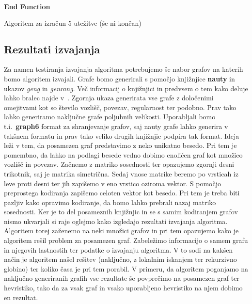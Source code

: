 \documentclass[12pt,a4paper,twoside]{article}
\theoremstyle{definition} %
\theoremstyle{plain} %
\numberwithin{equation}{section}  %
\begin{document}
\begin{algorithm}[H]

\textbf{End Function}



 
 \caption{Algoritem za izračun 5-utežitve (še ni končan)}
\end{algorithm}

\subsection{Rezultati izvajanja}
 Za namen testiranja izvajanja algoritma potrebujemo še nabor grafov na katerih bomo algoritem izvajali. Grafe bomo generirali s pomočjo knjižnjice \textbf{nauty} in ukazov \textit{geng} in \textit{genrang}. Več informacij o knjižnjici in predvsem o tem kako deluje lahko bralec najde v~\citet{nauty}. Zgornja ukaza generirata vse grafe z določenimi omejitvami kot so število vozlišč, povezav, regularnost ter podobno. Prav tako lahko generiramo naključne grafe poljubnih velikosti. Uporabljali bomo t.i.\ \textbf{graph6} format za shranjevanje grafov, saj nauty grafe lahko generira v takšnem formatu in prav tako veliko drugih knjižnjic podpira tak format. Ideja leži v tem, da posamezen graf predstavimo z neko unikatno besedo. Pri tem je pomembno, da lahko na podlagi besede vedno dobimo enoličen graf kot množico vozlišč in povezav. Začnemo z matriko sosednosti ter opazujemo zgornji desni trikotnik, saj je matrika simetrična. Sedaj vnose matrike beremo po vrsticah iz leve proti desni ter jih zapišemo v eno vrstico oziroma vektor. S pomočjo preprostega kodiranja zapišemo celoten vektor kot besedo. Pri tem je treba biti pazljiv kako opravimo kodiranje, da bomo lahko prebrali nazaj matriko sosednosti. Ker je to del posameznih knjižnjic in se s samim kodiranjem grafov nismo ukvarjali si raje oglejmo kako izgledajo rezultati izvajanja algoritma. Algoritem torej zaženemo na neki množici grafov in pri tem opazujemo kako je algoritem rešil problem za posamezen graf. Zabeležimo informacijo o samem grafu in njegovih lastnostih ter podatke o izvajanju algoritma. V to sodi na kakšen način je algoritem našel rešitev (naključno, z lokalnim iskanjem ter rekurzivno globino) ter koliko časa je pri tem porabil. V primeru, da algoritem poganjamo na naključno generiranih grafih vse rezultate še povprečimo na posamezen graf ter hevristiko, tako da za vsak graf in vsako uporabljeno hevristiko na njem dobimo en rezultat.
\end{document}
